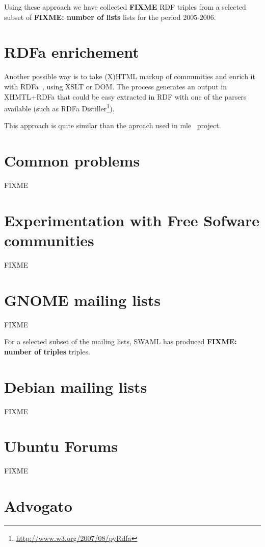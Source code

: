 \documentclass{../templates/www2008-submission}
\begin{document}
Using these approach we have collected \textbf{FIXME} RDF triples
from a selected subset of \textbf{FIXME: number of lists} lists for
the period 2005-2006.

\section{RDFa enrichement}

Another possible way is to take (X)HTML markup of communities and
enrich it with RDFa~\cite{Birbeck2006}, using XSLT or DOM. The process
generates an output in XHMTL+RDFa that could be easy extracted in RDF 
with one of the parsers available (such as RDFa Distiller\footnote{\url{http://www.w3.org/2007/08/pyRdfa}}).

This approach is quite similar than the aproach used in mle~\cite{Hausenblas2007}
project.


\section{Common problems}

FIXME

\section{Experimentation with Free Sofware communities}

FIXME

\section{\label{sec:gnome}GNOME mailing lists}

FIXME

For a selected subset of the mailing lists, SWAML has
produced \textbf{FIXME: number of triples} triples.

\section{Debian mailing lists}

FIXME

\section{Ubuntu Forums}

FIXME

\section{Advogato}
\end{document}

